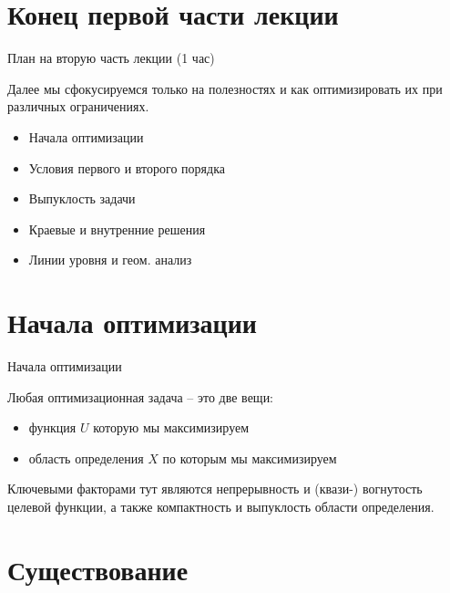 \documentclass{beamer}
\begin{document}
\section{Конец первой части лекции}

\begin{frame}{План на вторую часть лекции (1 час)}

Далее мы сфокусируемся только на полезностях и как оптимизировать их при различных ограничениях.

\begin{itemize}
  \item Начала оптимизации
  \item Условия первого и второго порядка
  \item Выпуклость задачи
  \item Краевые и внутренние решения
  \item Линии уровня и геом. анализ
\end{itemize}


\end{frame}

\section{Начала оптимизации}

\begin{frame}{Начала оптимизации}

Любая оптимизационная задача – это две вещи:

\begin{itemize}
  \item функция $U$ которую мы максимизируем
  \item область определения $X$ по которым мы максимизируем
\end{itemize}

Ключевыми факторами тут являются непрерывность и (квази-) вогнутость целевой функции, а также компактность и выпуклость области определения.

\end{frame}

\section{Существование}
\end{document}
